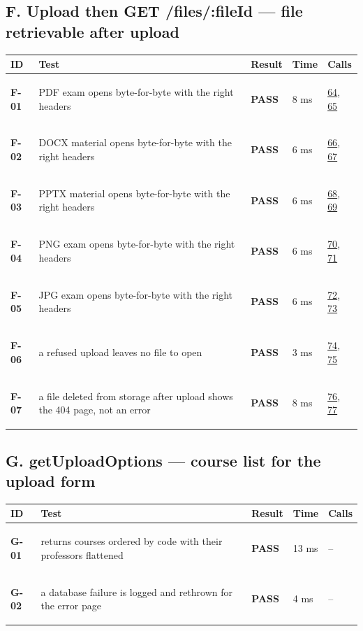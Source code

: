\documentclass[10pt,a4paper]{article}
\begin{document}
\subsection*{F. Upload then GET /files/:fileId — file retrievable after upload}
\begin{longtable}{@{}P{1.2cm}P{9.2cm}P{1.2cm}P{1.3cm}P{2.4cm}@{}}
\toprule \textbf{ID} & \textbf{Test} & \textbf{Result} & \textbf{Time} & \textbf{Calls} \\ \midrule \endhead
\hypertarget{test-F-01}{\textbf{F-01}} & PDF exam opens byte-for-byte with the right headers & \textcolor{passgreen}{\textbf{PASS}} & 8 ms & \hyperlink{call64}{64}, \hyperlink{call65}{65} \\
\hypertarget{test-F-02}{\textbf{F-02}} & DOCX material opens byte-for-byte with the right headers & \textcolor{passgreen}{\textbf{PASS}} & 6 ms & \hyperlink{call66}{66}, \hyperlink{call67}{67} \\
\hypertarget{test-F-03}{\textbf{F-03}} & PPTX material opens byte-for-byte with the right headers & \textcolor{passgreen}{\textbf{PASS}} & 6 ms & \hyperlink{call68}{68}, \hyperlink{call69}{69} \\
\hypertarget{test-F-04}{\textbf{F-04}} & PNG exam opens byte-for-byte with the right headers & \textcolor{passgreen}{\textbf{PASS}} & 6 ms & \hyperlink{call70}{70}, \hyperlink{call71}{71} \\
\hypertarget{test-F-05}{\textbf{F-05}} & JPG exam opens byte-for-byte with the right headers & \textcolor{passgreen}{\textbf{PASS}} & 6 ms & \hyperlink{call72}{72}, \hyperlink{call73}{73} \\
\hypertarget{test-F-06}{\textbf{F-06}} & a refused upload leaves no file to open & \textcolor{passgreen}{\textbf{PASS}} & 3 ms & \hyperlink{call74}{74}, \hyperlink{call75}{75} \\
\hypertarget{test-F-07}{\textbf{F-07}} & a file deleted from storage after upload shows the 404 page, not an error & \textcolor{passgreen}{\textbf{PASS}} & 8 ms & \hyperlink{call76}{76}, \hyperlink{call77}{77} \\
\bottomrule
\end{longtable}

\subsection*{G. getUploadOptions — course list for the upload form}
\begin{longtable}{@{}P{1.2cm}P{9.2cm}P{1.2cm}P{1.3cm}P{2.4cm}@{}}
\toprule \textbf{ID} & \textbf{Test} & \textbf{Result} & \textbf{Time} & \textbf{Calls} \\ \midrule \endhead
\hypertarget{test-G-01}{\textbf{G-01}} & returns courses ordered by code with their professors flattened & \textcolor{passgreen}{\textbf{PASS}} & 13 ms & -- \\
\hypertarget{test-G-02}{\textbf{G-02}} & a database failure is logged and rethrown for the error page & \textcolor{passgreen}{\textbf{PASS}} & 4 ms & -- \\
\bottomrule
\end{longtable}
\end{document}
